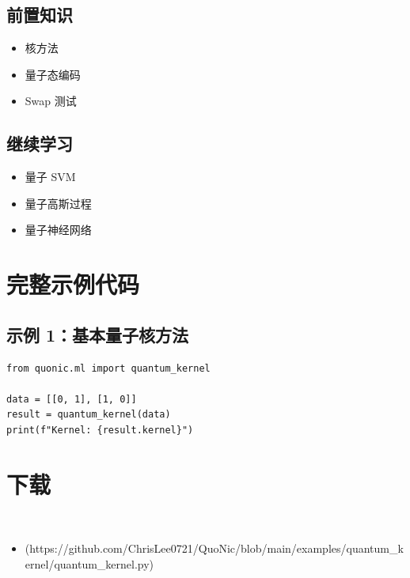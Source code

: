 \documentclass[12pt,a4paper]{article}
\begin{document}
\subsection{前置知识}
\begin{itemize}
  \item 核方法
  \item 量子态编码
  \item Swap 测试
\end{itemize}

\subsection{继续学习}
\begin{itemize}
  \item 量子 SVM
  \item 量子高斯过程
  \item 量子神经网络
\end{itemize}

\section{完整示例代码}

\subsection{示例 1：基本量子核方法}

\begin{lstlisting}[style=python]
from quonic.ml import quantum_kernel

data = [[0, 1], [1, 0]]
result = quantum_kernel(data)
print(f"Kernel: {result.kernel}")
\end{lstlisting}


\section{下载}

\begin{itemize}
  \item [quantum_kernel.py](https://github.com/ChrisLee0721/QuoNic/blob/main/examples/quantum_kernel/quantum_kernel.py)
\end{itemize}
\end{document}
